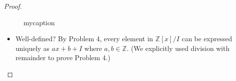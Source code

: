 \documentclass[12pt, psamsfonts]{amsart}
\theoremstyle{definition}
\theoremstyle{remark}
\numberwithin{equation}{section}
\begin{document}
\begin{proof}
\begin{enumerate}
\begin{figure}
        \caption{mycaption}
        \label{fig:iso}
      \end{figure}
      \begin{itemize}
        \item
          Well-defined?
          By Problem 4, every element in $\mathbb{Z}[x] / I$ can be expressed uniquely as $ax + b + I$ where $a, b \in \mathbb{Z}$.
          (We explicitly used division with remainder to prove Problem 4.)
      \end{itemize}
  \end{enumerate}
\end{proof}
\end{document}
